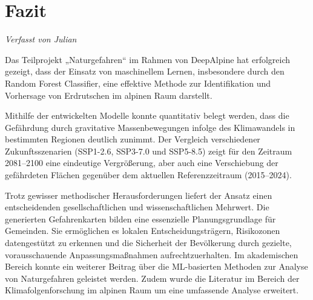 \documentclass[../main.tex]{subfiles}
\begin{document}
\chapter{Fazit}
\vspace{-0.5cm}
\noindent\textit{\small Verfasst von Julian}
\vspace{0.5cm}

Das Teilprojekt „Naturgefahren“ im Rahmen von DeepAlpine hat erfolgreich gezeigt, dass der Einsatz von maschinellem Lernen, insbesondere durch den Random Forest Classifier, eine effektive Methode zur Identifikation und Vorhersage von Erdrutschen im alpinen Raum darstellt. \par

Mithilfe der entwickelten Modelle konnte quantitativ belegt werden, dass die Gefährdung durch gravitative Massenbewegungen infolge des Klimawandels in bestimmten Regionen deutlich zunimmt.
Der Vergleich verschiedener Zukunftsszenarien (SSP1-2.6, SSP3-7.0 und SSP5-8.5) zeigt für den Zeitraum 2081–2100 eine eindeutige Vergrößerung, aber auch eine Verschiebung der gefährdeten Flächen gegenüber dem aktuellen Referenzzeitraum (2015–2024). \par

Trotz gewisser methodischer Herausforderungen liefert der Ansatz einen entscheidenden gesellschaftlichen und wissenschaftlichen Mehrwert.
Die generierten Gefahrenkarten bilden eine essenzielle Planungsgrundlage für Gemeinden.
Sie ermöglichen es lokalen Entscheidungsträgern, Risikozonen datengestützt zu erkennen und die Sicherheit der Bevölkerung durch gezielte, vorausschauende Anpassungsmaßnahmen aufrechtzuerhalten.
Im akademischen Bereich konnte ein weiterer Beitrag über die ML-basierten Methoden zur Analyse von Naturgefahren geleistet werden.
Zudem wurde die Literatur im Bereich der Klimafolgenforschung im alpinen Raum um eine umfassende Analyse erweitert.
\end{document}
